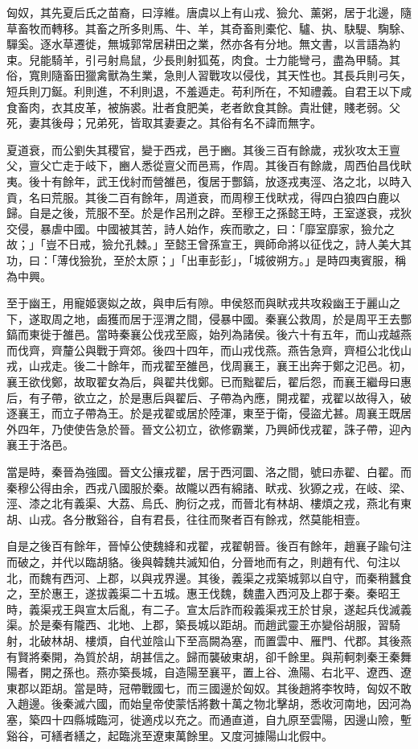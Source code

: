 
\begin{pinyinscope}
匈奴，其先夏后氏之苗裔，曰淳維。唐虞以上有山戎、獫允、薰粥，居于北邊，隨草畜牧而轉移。其畜之所多則馬、牛、羊，其奇畜則橐佗、驢、执、駃騠、騊駼、驒奚。逐水草遷徙，無城郭常居耕田之業，然亦各有分地。無文書，以言語為約束。兒能騎羊，引弓射鳥鼠，少長則射狐菟，肉食。士力能彎弓，盡為甲騎。其俗，寬則隨畜田獵禽獸為生業，急則人習戰攻以侵伐，其天性也。其長兵則弓矢，短兵則刀鋋。利則進，不利則退，不羞遁走。苟利所在，不知禮義。自君王以下咸食畜肉，衣其皮革，被旃裘。壯者食肥美，老者飲食其餘。貴壯健，賤老弱。父死，妻其後母；兄弟死，皆取其妻妻之。其俗有名不諱而無字。

夏道衰，而公劉失其稷官，變于西戎，邑于豳。其後三百有餘歲，戎狄攻太王亶父，亶父亡走于岐下，豳人悉從亶父而邑焉，作周。其後百有餘歲，周西伯昌伐畎夷。後十有餘年，武王伐紂而營雒邑，復居于酆鎬，放逐戎夷涇、洛之北，以時入貢，名曰荒服。其後二百有餘年，周道衰，而周穆王伐畎戎，得四白狼四白鹿以歸。自是之後，荒服不至。於是作呂刑之辟。至穆王之孫懿王時，王室遂衰，戎狄交侵，暴虐中國。中國被其苦，詩人始作，疾而歌之，曰：「靡室靡家，獫允之故；」「豈不日戒，獫允孔棘。」至懿王曾孫宣王，興師命將以征伐之，詩人美大其功，曰：「薄伐獫狁，至於太原；」「出車彭彭」，「城彼朔方。」是時四夷賓服，稱為中興。

至于幽王，用寵姬褒姒之故，與申后有隙。申侯怒而與畎戎共攻殺幽王于麗山之下，遂取周之地，鹵獲而居于涇渭之間，侵暴中國。秦襄公救周，於是周平王去酆鎬而東徙于雒邑。當時秦襄公伐戎至廄，始列為諸侯。後六十有五年，而山戎越燕而伐齊，齊釐公與戰于齊郊。後四十四年，而山戎伐燕。燕告急齊，齊桓公北伐山戎，山戎走。後二十餘年，而戎翟至雒邑，伐周襄王，襄王出奔于鄭之氾邑。初，襄王欲伐鄭，故取翟女為后，與翟共伐鄭。已而黜翟后，翟后怨，而襄王繼母曰惠后，有子帶，欲立之，於是惠后與翟后、子帶為內應，開戎翟，戎翟以故得入，破逐襄王，而立子帶為王。於是戎翟或居於陸渾，東至于衛，侵盜尤甚。周襄王既居外四年，乃使使告急於晉。晉文公初立，欲修霸業，乃興師伐戎翟，誅子帶，迎內襄王于洛邑。

當是時，秦晉為強國。晉文公攘戎翟，居于西河圜、洛之間，號曰赤翟、白翟。而秦穆公得由余，西戎八國服於秦。故隴以西有綿諸、畎戎、狄獂之戎，在岐、梁、涇、漆之北有義渠、大荔、烏氏、朐衍之戎，而晉北有林胡、樓煩之戎，燕北有東胡、山戎。各分散谿谷，自有君長，往往而聚者百有餘戎，然莫能相壹。

自是之後百有餘年，晉悼公使魏絳和戎翟，戎翟朝晉。後百有餘年，趙襄子踰句注而破之，并代以臨胡貉。後與韓魏共滅知伯，分晉地而有之，則趙有代、句注以北，而魏有西河、上郡，以與戎界邊。其後，義渠之戎築城郭以自守，而秦稍蠶食之，至於惠王，遂拔義渠二十五城。惠王伐魏，魏盡入西河及上郡于秦。秦昭王時，義渠戎王與宣太后亂，有二子。宣太后詐而殺義渠戎王於甘泉，遂起兵伐滅義渠。於是秦有隴西、北地、上郡，築長城以距胡。而趙武靈王亦變俗胡服，習騎射，北破林胡、樓煩，自代並陰山下至高闕為塞，而置雲中、雁門、代郡。其後燕有賢將秦開，為質於胡，胡甚信之。歸而襲破東胡，卻千餘里。與荊軻刺秦王秦舞陽者，開之孫也。燕亦築長城，自造陽至襄平，置上谷、漁陽、右北平、遼西、遼東郡以距胡。當是時，冠帶戰國七，而三國邊於匈奴。其後趙將李牧時，匈奴不敢入趙邊。後秦滅六國，而始皇帝使蒙恬將數十萬之物北擊胡，悉收河南地，因河為塞，築四十四縣城臨河，徙適戍以充之。而通直道，自九原至雲陽，因邊山險，塹谿谷，可繕者繕之，起臨洮至遼東萬餘里。又度河據陽山北假中。


\end{pinyinscope}
